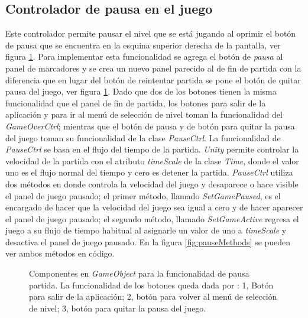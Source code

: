 \subsection{Controlador de pausa en el juego}
Este controlador permite pausar el nivel que se está jugando al oprimir el botón
de pausa que se encuentra en la esquina superior derecha de la pantalla, ver
figura \ref{fig:PausedFuctionality}. Para implementar esta funcionalidad se
agrega el botón de \textit{pausa} al panel de marcadores y se crea un nuevo
panel parecido al de fin de partida con la diferencia que en lugar del botón de
reintentar partida se pone el botón de quitar pausa del juego, ver figura
\ref{fig:PausedFuctionality}. Dado que dos de los botones tienen la misma
funcionalidad que el panel de fin de partida, los botones para salir de la
aplicación y para ir al menú de selección de nivel toman la funcionalidad del
\textit{GameOverCtrl}; mientras que el botón de pausa y de botón para quitar la
pausa del juego toman su funcionalidad de la clase \textit{PauseCtrl}. La
funcionalidad de \textit{PauseCtrl} se basa en el flujo del tiempo de la
partida. \textit{Unity} permite controlar la velocidad de la partida con el
atributo \textit{timeScale} de la clase \textit{Time}, donde el valor uno es el
flujo normal del tiempo y cero es detener la partida. \textit{PauseCtrl} utiliza
dos métodos en donde controla la velocidad del juego y desaparece o hace visible
el panel de juego pausado; el primer método, llamado \textit{SetGamePaused}, es
el encargado de hacer que la velocidad del juego sea igual a cero y de hacer
aparecer el panel de juego pausado; el segundo método, llamado
\textit{SetGameActive} regresa el juego a su flujo de tiempo habitual al
asignarle un valor de uno a \textit{timeScale} y desactiva el panel de juego
pausado. En la figura \ref{fig:pauseMethods} se pueden ver ambos métodos en
código.

\begin{figure}
  \centering
   
     

  \caption{Componentes en \textit{GameObject} para la funcionalidad de pausa
  partida. La funcionalidad de los botones queda dada por : 1, Botón para salir
  de la aplicación; 2, botón para volver al menú de selección de nivel; 3, botón
  para quitar la pausa del juego. }
  \label{fig:PausedFuctionality}
\end{figure}

